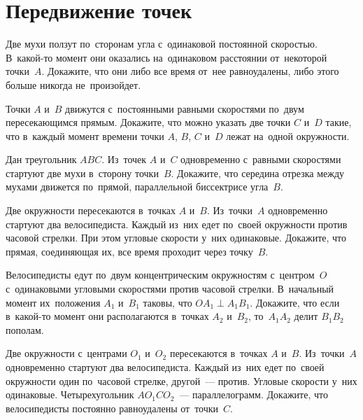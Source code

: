 
\section*{Передвижение точек}


\begin{problems}

\item
Две мухи ползут по~сторонам угла с~одинаковой постоянной скоростью.
В~какой-то момент они оказались на~одинаковом расстоянии от~некоторой
точки~$A$.
Докажите, что они либо все время от~нее равноудалены, либо этого больше никогда
не~произойдет.

\item
Точки $A$ и~$B$ движутся с~постоянными равными скоростями по~двум
пересекающимся прямым.
Докажите, что можно указать две точки $C$ и~$D$ такие, что в~каждый момент
времени точки $A$, $B$, $C$ и~$D$ лежат на~одной окружности.

\item
Дан треугольник $ABC$.
Из~точек $A$ и~$C$ одновременно с~равными скоростями стартуют две мухи
в~сторону точки~$B$.
Докажите, что середина отрезка между мухами движется по~прямой, параллельной
биссектрисе угла~$B$.

\item
Две окружности пересекаются в~точках $A$ и~$B$.
Из~точки~$A$ одновременно стартуют два велосипедиста.
Каждый из~них едет по~своей окружности против часовой стрелки.
При этом угловые скорости у~них одинаковые.
Докажите, что прямая, соединяющая их, все время проходит через точку~$B$.

\item
Велосипедисты едут по~двум концентрическим окружностям с~центром~$O$
с~одинаковыми угловыми скоростями против часовой стрелки.
В~начальный момент их~положения $A_1$  и~$B_1$ таковы, что
$O A_1 \perp A_1 B_1$.
Докажите, что если в~какой-то момент они располагаются в~точках $A_2$ и~$B_2$,
то~$A_1 A_2$ делит $B_1 B_2$ пополам.

\item
Две окружности с~центрами $O_1$ и~$O_2$ пересекаются в~точках $A$ и~$B$.
Из~точки~$A$ одновременно стартуют два велосипедиста.
Каждый из~них едет по~своей окружности один по~часовой стрелке, другой~---
против.
Угловые скорости у~них одинаковые.
Четырехугольник $A O_1 C O_2$~--- параллелограмм.
Докажите, что велосипедисты постоянно равноудалены от~точки~$C$.


\end{problems}
